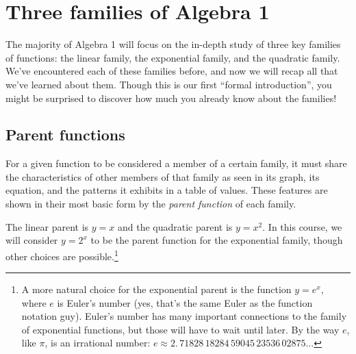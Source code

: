 \section{Three families of Algebra 1}
\label{sec:threefamilies}


The majority of Algebra 1 will focus on the in-depth study of three key families of functions: the linear family, the exponential family, and the quadratic family. We've encountered each of these families before, and now we will recap all that we've learned about them. Though this is our first ``formal introduction'', you might be surprised to discover how much you already know about the families!


\subsection{Parent functions}

For a given function to be considered a member of a certain family, it must share the characteristics of other members of that family as seen in its graph, its equation, and the patterns it exhibits in a table of values. These features are shown in their most basic form by the \textit{parent function} of each family.

The linear parent is $y=x$ and the quadratic parent is $y=x^2$. In this course, we will consider $y=2^x$ to be the parent function for the exponential family, though other choices are possible.\footnote{A more natural choice for the exponential parent is the function $y=e^x$, where $e$ is Euler's number (yes, that's the same Euler as the function notation guy). Euler's number has many important connections to the family of exponential functions, but those will have to wait until later. By the way $e$, like $\pi$, is an irrational number: $e \approx 2.\, 71828\, 18284\, 59045\, 23536\, 02875\dotso$}

